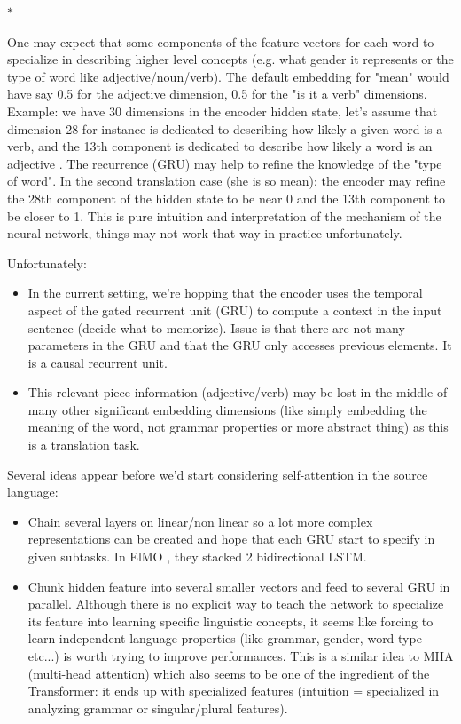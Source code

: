 \documentclass[a4paper]{article}
\begin{document}
\begin{center}
  $\ast$
\end{center}


One may expect that some components of the feature vectors for each word to specialize in describing higher level concepts (e.g. what gender it represents or the type of word like adjective/noun/verb). The default embedding for "mean" would have say 0.5 for the adjective dimension, 0.5 for the "is it a verb" dimensions. \\
Example: we have 30 dimensions in the encoder hidden state, let's assume that dimension 28 for instance is dedicated to describing how likely a given word is a verb, and the 13th component is dedicated to describe how likely a word is an adjective . 
The recurrence (GRU) may help to refine the knowledge of the "type of word". In the second translation case (she is so mean): the encoder may refine the 28th component of the hidden state to be near 0 and the 13th component to be closer to 1. This is pure intuition and interpretation of the mechanism of the neural network, things may not work that way in practice unfortunately.

Unfortunately:
\begin{itemize}
\item In the current setting, we're hopping that the encoder uses the temporal aspect of the gated recurrent unit (GRU) to compute a context in the input sentence (decide what to memorize). Issue is that there are not many parameters in the GRU and that the GRU only accesses previous elements. It is a causal recurrent unit.
\item This relevant piece information (adjective/verb) may be lost in the middle of many other significant embedding dimensions (like simply embedding the meaning of the word, not grammar properties or more abstract thing) as this is a translation task.
\end{itemize}



Several ideas appear before we'd start considering self-attention in the source language:
\begin{itemize}
\item Chain several layers on linear/non linear so a lot more complex representations can be created and hope that each GRU start to specify in given subtasks. In ElMO \cite{context_rep}, they stacked 2 bidirectional LSTM.
\item Chunk hidden feature into several smaller vectors and feed to several GRU in parallel. Although there is no explicit way to teach the network to specialize its feature into learning specific linguistic concepts, it seems like forcing to learn independent language properties (like grammar, gender, word type etc...) is worth trying to improve performances. This is a similar idea to MHA (multi-head attention) which also seems to be one of the ingredient of the Transformer: it ends up with specialized features (intuition  = specialized in analyzing grammar or singular/plural features).
\end{itemize}
\end{document}
